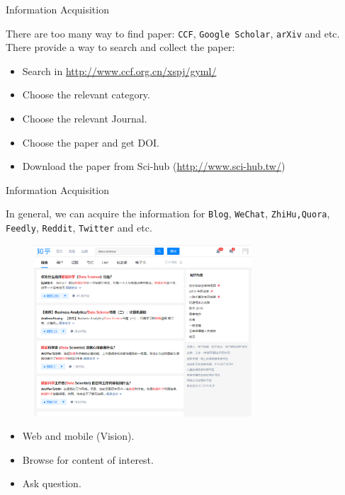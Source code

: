 \documentclass[
 size=14pt,
 paper=smartboard,  %
 mode=present, 		%
 display=slides, 	%
 style=tuliplab,  	%
 pauseslide,
 fleqn,leqno]{powerdot}{}
\begin{document}
\begin{slide}{Information Acquisition}

There are too many way to find paper: \texttt{CCF}, \texttt{Google Scholar}, \texttt{arXiv} and etc.\\
There provide a way to search and collect the paper:
\begin{itemize}
  \item Search in \url{http://www.ccf.org.cn/xspj/gyml/}
  \item Choose the relevant category.
  \item Choose the relevant Journal.
  \item Choose the paper and get DOI.
  \item Download the paper from Sci-hub (\url{http://www.sci-hub.tw/})
\end{itemize}


\end{slide}

\begin{slide}[toc=,bm=]{Information Acquisition}

In general, we can acquire the information for \texttt{Blog}, \texttt{WeChat}, \texttt{ZhiHu,Quora},
\texttt{Feedly}, \texttt{Reddit}, \texttt{Twitter} and etc.

\begin{figure}
  \centering
  \includegraphics[width=3.2in]{figures/management/zhihu.eps}\\
\end{figure}

\begin{itemize}
  \item Web and mobile (Vision).
  \item Browse for content of interest.
  \item Ask question.
\end{itemize}

\end{slide}
\end{document}
